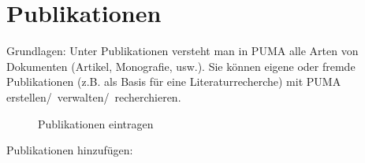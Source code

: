 \section{Publikationen}
Grundlagen:
\newline
Unter Publikationen versteht man in PUMA alle Arten von Dokumenten (Artikel, Monografie, usw.). Sie können eigene oder fremde Publikationen (z.B. als Basis für eine Literaturrecherche) mit PUMA erstellen/~verwalten/~recherchieren. 
\begin{figure}[h!]
 \centering
 \caption{Publikationen eintragen}
 \label{figure008}
\end{figure}  
Publikationen hinzufügen:
